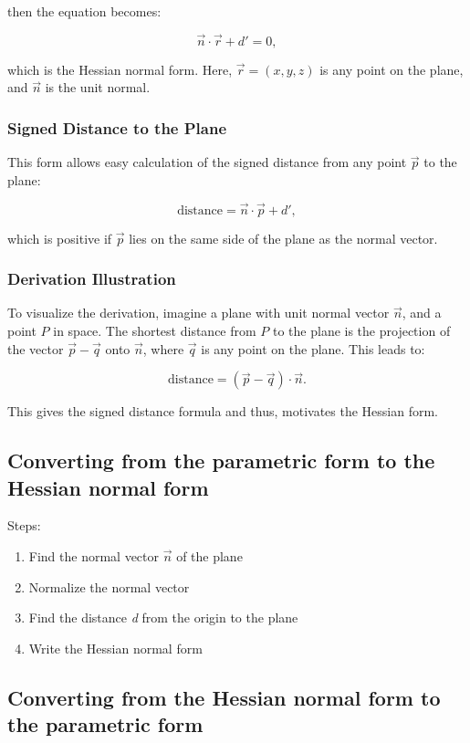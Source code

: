then the equation becomes:

\[
	\vec{n} \cdot \vec{r} + d' = 0,
\]

which is the Hessian normal form. Here, \(\vec{r} = (x, y, z)\) is any point on the plane, and \(\vec{n}\) is the unit normal.

\subsubsection{Signed Distance to the Plane}

This form allows easy calculation of the signed distance from any point \(\vec{p}\) to the plane:

\[
	\text{distance} = \vec{n} \cdot \vec{p} + d',
\]

which is positive if \(\vec{p}\) lies on the same side of the plane as the normal vector.

\subsubsection{Derivation Illustration}

To visualize the derivation, imagine a plane with unit normal vector \(\vec{n}\), and a point \(P\) in space. The shortest distance from \(P\) to the plane is the projection of the vector \(\vec{p} - \vec{q}\) onto \(\vec{n}\), where \(\vec{q}\) is any point on the plane. This leads to:

\[
	\text{distance} = (\vec{p} - \vec{q}) \cdot \vec{n}.
\]

This gives the signed distance formula and thus, motivates the Hessian form.

\subsection{Converting from the parametric form to the Hessian normal form}

Steps:

\begin{enumerate}
	\item Find the normal vector \(\vec{n}\) of the plane
	\item Normalize the normal vector
	\item Find the distance \emph{d} from the origin to the plane
	\item Write the Hessian normal form
\end{enumerate}

\subsection{Converting from the Hessian normal form to the parametric form}

